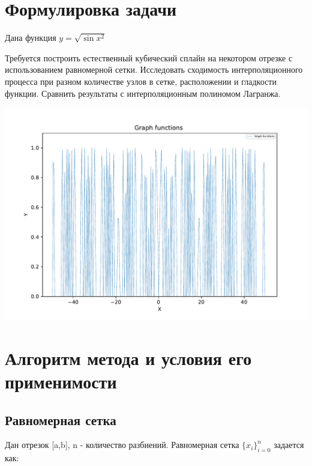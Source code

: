 






\section{Формулировка задачи}

Дана функция 
\begin{math} 
	y=\sqrt{\sin{x^{2}}}
\end{math}

Требуется построить естественный кубический сплайн на некотором отрезке с использованием равномерной сетки. Исследовать сходимость интерполяционного процесса при разном количестве узлов в сетке, расположении и гладкости функции. Сравнить результаты с интерполяционным полиномом Лагранжа.

\includegraphics[scale=0.75]{graph.pdf}

\section{Алгоритм метода и условия его применимости}

\subsection{Равномерная сетка}
Дан отрезок [a,b], n - количество разбиений. Равномерная сетка 
\begin{math} 
	\{x_{i}\}_{i=0}^{n}
\end{math}
задается как: 

